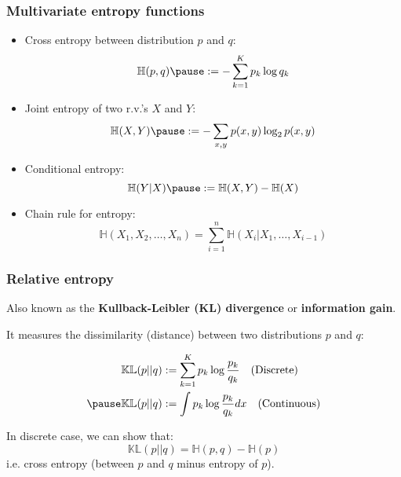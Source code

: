 \documentclass[smaller]{beamer}
\newcommand{\?}{\stackrel{?}{=}}
\newcommand{\fr}{\frac}
\newcommand{\mb}{\mathbb}
\begin{document}
\begin{frame}
  \frametitle{Multivariate entropy functions}
  \pause
  \begin{itemize}
  \item Cross entropy between distribution $p$ and $q$: \pause
    \begin{equation}
      \mb{H}(p,q) \pause := -\sum_{k=1}^{K} p_{k}\log q_{k}
    \end{equation}
    \pause

  \item Joint entropy of two r.v.'s $X$ and $Y$: \pause
    \begin{equation}
      \mb{H}(X,Y) \pause := -\sum_{x,y}p(x,y) \log_{2}p(x,y)
    \end{equation}

  \item Conditional entropy: \pause
    \begin{equation}
      \mb{H}(Y|X) \pause := \mb{H}(X, Y) - \mb{H}(X)
    \end{equation}

    \pause

  \item Chain rule for entropy: \pause
    \begin{equation}
      \mb{H}(X_{1}, X_{2}, \ldots, X_{n}) = \sum_{i=1}^{n}\mb{H}(X_{i}|X_{1}, \ldots, X_{i-1})
    \end{equation}
  \end{itemize}
\end{frame}

\begin{frame}
  \frametitle{Relative entropy}
  \pause

  Also known as the \textbf{Kullback-Leibler (KL) divergence} or \textbf{information gain}.\pause

  \bigskip

  It measures the dissimilarity (distance) between two distributions $p$ and $q$: \pause

  \begin{align}
    \mb{KL}(p||q)  & := \sum_{k=1}^{K} p_{k}\log\fr{p_{k}}{q_{k}} \quad \text{(Discrete)} \\\pause
    \mb{KL}(p||q)  & := \int p_{k}\log\fr{p_{k}}{q_{k}} dx \quad \text{(Continuous)} 
  \end{align}

  \pause

  In discrete case, we can show that: \pause
  \begin{equation}
     \mb{KL}(p||q) = \mb{H}(p,q) - \mb{H}(p)
  \end{equation}
  \pause
  i.e. cross entropy (between $p$ and $q$ minus entropy of $p$).
    
\end{frame}
\end{document}
